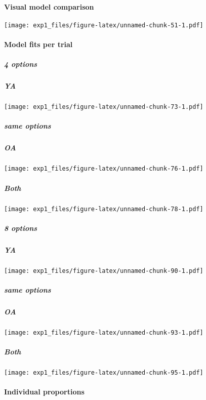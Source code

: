 \documentclass[,]{article}
\let\oldparagraph\paragraph
\renewcommand{\paragraph}[1]{\oldparagraph{#1}\mbox{}}
\let\oldsubparagraph\subparagraph
\renewcommand{\subparagraph}[1]{\oldsubparagraph{#1}\mbox{}}
\begin{document}
\newpage

\paragraph{Visual model comparison}\label{visual-model-comparison}

\texttt{[image: exp1\_files/figure-latex/unnamed-chunk-51-1.pdf]}

\newpage

\paragraph{Model fits per trial}\label{model-fits-per-trial}

\subparagraph{4 options}\label{options}

\subparagraph{YA}\label{ya}

\texttt{[image: exp1\_files/figure-latex/unnamed-chunk-73-1.pdf]}

\newpage

\subparagraph{same options}\label{same-options}

\subparagraph{OA}\label{oa}

\texttt{[image: exp1\_files/figure-latex/unnamed-chunk-76-1.pdf]}

\newpage

\subparagraph{Both}\label{both}

\texttt{[image: exp1\_files/figure-latex/unnamed-chunk-78-1.pdf]}

\newpage 

\subparagraph{8 options}\label{options-1}

\subparagraph{YA}\label{ya-1}

\texttt{[image: exp1\_files/figure-latex/unnamed-chunk-90-1.pdf]}

\newpage

\subparagraph{same options}\label{same-options-1}

\subparagraph{OA}\label{oa-1}

\texttt{[image: exp1\_files/figure-latex/unnamed-chunk-93-1.pdf]}

\newpage

\subparagraph{Both}\label{both-1}

\texttt{[image: exp1\_files/figure-latex/unnamed-chunk-95-1.pdf]}

\newpage

\newpage

\paragraph{Individual proportions}\label{individual-proportions}
\end{document}
